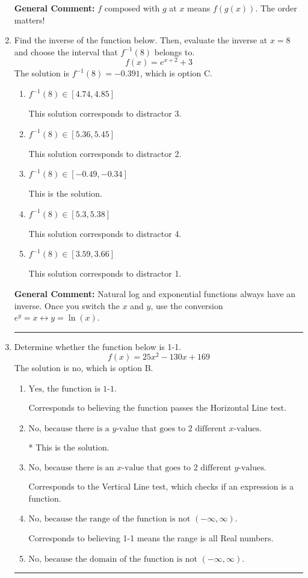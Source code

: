 \documentclass{extbook}[14pt]
\newcommand{\litem}[1]{\item #1

\rule{\textwidth}{0.4pt}}
\begin{document}
\begin{enumerate}
{\textbf{General Comment:} $f$ composed with $g$ at $x$ means $f(g(x))$. The order matters!
}
\litem{
Find the inverse of the function below. Then, evaluate the inverse at $x = 8$ and choose the interval that $f^{-1}(8)$ belongs to.
\[ f(x) = e^{x+2}+3 \]The solution is \( f^{-1}(8) = -0.391 \), which is option C.\begin{enumerate}[label=\Alph*.]
\item \( f^{-1}(8) \in [4.74, 4.85] \)

 This solution corresponds to distractor 3.
\item \( f^{-1}(8) \in [5.36, 5.45] \)

 This solution corresponds to distractor 2.
\item \( f^{-1}(8) \in [-0.49, -0.34] \)

 This is the solution.
\item \( f^{-1}(8) \in [5.3, 5.38] \)

 This solution corresponds to distractor 4.
\item \( f^{-1}(8) \in [3.59, 3.66] \)

 This solution corresponds to distractor 1.
\end{enumerate}

\textbf{General Comment:} Natural log and exponential functions always have an inverse. Once you switch the $x$ and $y$, use the conversion $ e^y = x \leftrightarrow y=\ln(x)$.
}
\litem{
Determine whether the function below is 1-1.
\[ f(x) = 25 x^2 - 130 x + 169 \]The solution is \( \text{no} \), which is option B.\begin{enumerate}[label=\Alph*.]
\item \( \text{Yes, the function is 1-1.} \)

Corresponds to believing the function passes the Horizontal Line test.
\item \( \text{No, because there is a $y$-value that goes to 2 different $x$-values.} \)

* This is the solution.
\item \( \text{No, because there is an $x$-value that goes to 2 different $y$-values.} \)

Corresponds to the Vertical Line test, which checks if an expression is a function.
\item \( \text{No, because the range of the function is not $(-\infty, \infty)$.} \)

Corresponds to believing 1-1 means the range is all Real numbers.
\item \( \text{No, because the domain of the function is not $(-\infty, \infty)$.} \)


\end{enumerate}}
\end{enumerate}
\end{document}
